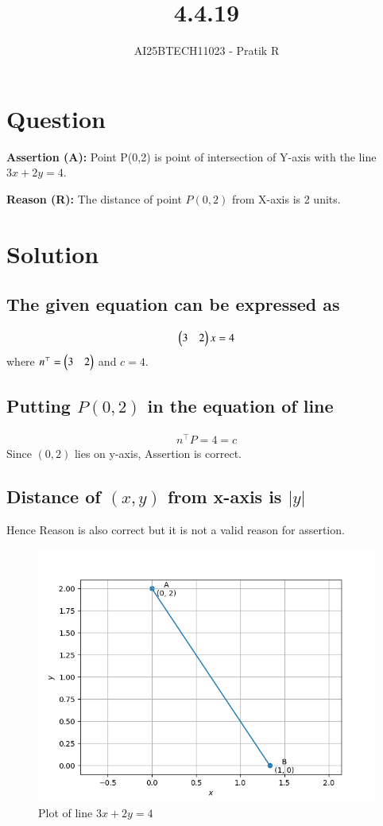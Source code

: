 \documentclass[journal]{IEEEtran}
\begin{document}

\vspace{3cm}

\title{4.4.19}
\author{AI25BTECH11023 - Pratik R}
{\let\newpage\relax\maketitle}

\renewcommand{\thefigure}{\theenumi}
\renewcommand{\thetable}{\theenumi}
\setlength{\intextsep}{10pt} %


\renewcommand{\thetable}{\theenumi}


\section*{\textbf{Question}}
\textbf{Assertion (A):} Point P(0,2) is point of intersection of Y-axis with the line
$3x + 2y = 4$.

\textbf{Reason (R):} The distance of point $P(0,2)$ from X-axis is 2 units. 
\section*{\textbf{Solution}}
\subsection*{\textbf{The given equation can be expressed as}}
\begin{align}
    \begin{pmatrix}3 & 2\end{pmatrix}x =4
\end{align}
where $n^\top = \begin{pmatrix}3&2\end{pmatrix}$ and $c = 4$.

\subsection*{\textbf{Putting $P(0,2)$ in the equation of line}}
\begin{align}
n^\top P =4=c
\end{align}
Since $(0,2)$ lies on y-axis, Assertion is correct.

\subsection*{\textbf{Distance of $(x,y)$ from x-axis is $|y|$}}

Hence Reason is also correct but it is not a valid reason for assertion.
\newpage

\begin{figure}[H]
\centering
\includegraphics[width=0.7\columnwidth]{figs/fig.png} 
\caption{Plot of line $3x+2y=4$}
\label{}
\end{figure}
\end{document}
